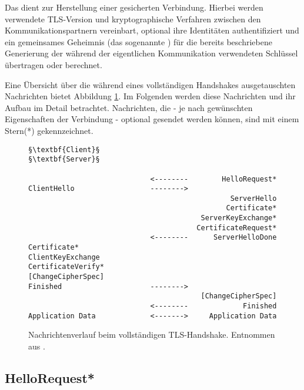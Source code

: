 \label{sec_tls_handshake}

Das \handshakeprotocol{} dient zur Herstellung einer gesicherten Verbindung. Hierbei werden verwendete TLS-Version und kryptographische Verfahren zwischen den Kommunikationspartnern vereinbart, optional ihre Identitäten authentifiziert und ein gemeinsames Geheimnis (das sogenannte \premastersecret{}) für die bereits beschriebene Generierung der während der eigentlichen Kommunikation verwendeten Schlüssel übertragen oder berechnet. 

Eine Übersicht über die während eines vollständigen Handshakes ausgetauschten Nachrichten bietet Abbildung \ref{fig_complete_handshake}. Im Folgenden werden diese Nachrichten und ihr Aufbau im Detail betrachtet. Nachrichten, die - je nach gewünschten Eigenschaften der Verbindung - optional gesendet werden können, sind mit einem Stern(*) gekennzeichnet.


\lstset{
	style=default,
	frame=single
}
\begin{figure}[H]
	\centering
	\begin{lstlisting}
§\textbf{Client}§                                               §\textbf{Server}§

                             <--------        HelloRequest*
ClientHello                  -------->
                                                ServerHello
                                               Certificate*
                                         ServerKeyExchange*
                                        CertificateRequest*
                             <--------      ServerHelloDone
Certificate*
ClientKeyExchange
CertificateVerify*
[ChangeCipherSpec]
Finished                     -------->
                                         [ChangeCipherSpec]
                             <--------             Finished
Application Data             <------->     Application Data
	\end{lstlisting}
	\caption{Nachrichtenverlauf beim vollständigen TLS-Handshake. Entnommen aus \cite{tls12}.}
	\label{fig_complete_handshake}
\end{figure}
\lstset{style=tls}

\subsection*{HelloRequest*}

